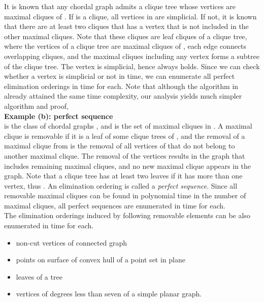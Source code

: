 \documentclass{llncs}
\begin{document}
It is known that any chordal graph  admits a clique tree whose
 vertices are maximal cliques of .
If  is a clique, all vertices in  are simplicial.
If not, it is known that there are at least two cliques that has a vertex
 that is not included in the other maximal cliques.
Note that these cliques are leaf cliques of a clique tree, where 
 the vertices of a clique tree are maximal cliques of , 
 each edge connects overlapping cliques, and the maximal cliques 
 including any vertex forms a subtree of the clique tree.
The vertex is simplicial, hence  always holds.
Since we can check whether a vertex is simplicial or not in 
 time, we can enumerate all perfect elimination orderings in 
 time for each.
Note that although the algorithm in \cite{enumPEO} already attained the same 
 time complexity, our analysis yields much simpler algorithm and proof,
\\

\vspace{-1mm}
{\bf Example (b): perfect sequence\cite{perfectseq}}\\
 is the class of chordal graphs , and  is the set of
 maximal cliques in .
A maximal clique is removable if it is a leaf of some clique trees of ,
 and the removal of a maximal clique  from  is the removal of all
  vertices of  that do not belong to another maximal clique.
The removal of the vertices results in the graph that includes remaining 
 maximal cliques, and no new maximal clique appears in the graph.
Note that a clique tree has at least two leaves if it has more than one 
 vertex, thus .
An elimination ordering is called a {\em perfect sequence}.
Since all removable maximal cliques can be found in polynomial
 time in the number of maximal cliques\cite{perfectseq},
 all perfect sequences are enumerated in  time for each.\\

\vspace{-1mm}
The elimination orderings induced by following removable elements 
 can be also enumerated in  time for each.
 
\vspace{-2mm}
\begin{itemize}
\item non-cut vertices of connected graph
\item points on surface of convex hull of a point set in plane
\item leaves of a tree
\item vertices of degrees less than seven of a simple planar graph.
\end{itemize}
\end{document}
